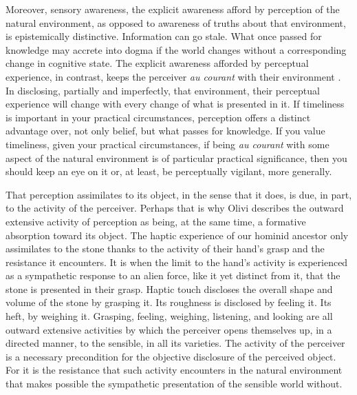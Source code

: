 Moreover, sensory awareness, the explicit awareness afford by perception of the natural environment, as opposed to awareness of truths about that environment, is epistemically distinctive. Information can go stale. What once passed for knowledge may accrete into dogma if the world changes without a corresponding change in cognitive state. The explicit awareness afforded by perceptual experience, in contrast, keeps the perceiver \emph{au courant} with their environment \citep[173--174]{Travis:2013tk}. In disclosing, partially and imperfectly, that environment, their perceptual experience will change with every change of what is presented in it. If timeliness is important in your practical circumstances, perception offers a distinct advantage over, not only belief, but what passes for knowledge. If you value timeliness, given your practical circumstances, if being \emph{au courant} with some aspect of the natural environment is of particular practical significance, then you should keep an eye on it or, at least, be perceptually vigilant, more generally.

That perception assimilates to its object, in the sense that it does, is due, in part, to the activity of the perceiver. Perhaps that is why Olivi describes the outward extensive activity of perception as being, at the same time, a formative absorption toward its object.  The haptic experience of our hominid ancestor only assimilates to the stone thanks to the activity of their hand's grasp and the resistance it encounters. It is when the limit to the hand's activity is experienced as a sympathetic response to an alien force, like it yet distinct from it, that the stone is presented in their grasp. Haptic touch discloses the overall shape and volume of the stone by grasping it. Its roughness is disclosed by feeling it. Its heft, by weighing it. Grasping, feeling, weighing, listening, and looking are all outward extensive activities by which the perceiver opens themselves up, in a directed manner, to the sensible, in all its varieties. The activity of the perceiver is a necessary precondition for the objective disclosure of the perceived object. For it is the resistance that such activity encounters in the natural environment that makes possible the sympathetic presentation of the sensible world without.

